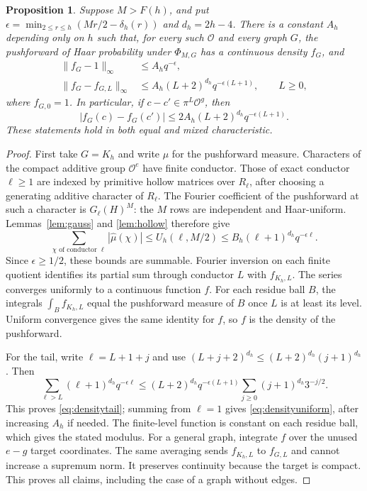 \documentclass[11pt]{article}
\numberwithin{equation}{section}
\newtheorem{proposition}[theorem]{Proposition}
\theoremstyle{remark}
\begin{document}
\begin{proposition}\label{prop:density}
Suppose $M>F(h)$, and put
$\epsilon=\min_{2\le r\le h}(Mr/2-\delta_h(r))$ and $d_h=2h-4$.
There is a constant $A_h$ depending only on $h$ such that, for every
such $\mathcal O$ and every graph $G$, the pushforward of Haar probability
under $\Phi_{M,G}$ has a continuous density $f_G$, and
\begin{align}
 \|f_G-1\|_\infty&\le A_hq^{-\epsilon},\label{eq:densityuniform}\\
 \|f_G-f_{G,L}\|_\infty
   &\le A_h(L+2)^{d_h}q^{-\epsilon(L+1)},\qquad L\ge0,
       \label{eq:densitytail}
\end{align}
where $f_{G,0}=1$. In particular, if $c-c'\in\pi^L\mathcal O^g$, then
\[
 |f_G(c)-f_G(c')|
 \le 2A_h(L+2)^{d_h}q^{-\epsilon(L+1)}.
\]
These statements hold in both equal and mixed characteristic.
\end{proposition}
\begin{proof}
First take $G=K_h$ and write $\mu$ for the pushforward measure. Characters of the compact additive group
$\mathcal O^e$ have finite conductor. Those of exact conductor
$\ell\ge1$ are indexed by primitive hollow matrices over $R_\ell$,
after choosing a generating additive character of $R_\ell$.
The Fourier coefficient of the pushforward at such a character is
$G_\ell(H)^M$: the $M$ rows are independent and Haar-uniform.
Lemmas~\ref{lem:gauss} and \ref{lem:hollow} therefore give
\[
 \sum_{\chi\text{ of conductor }\ell}
       |\widehat\mu(\chi)|
   \le U_h(\ell,M/2)
   \le B_h(\ell+1)^{d_h}q^{-\epsilon\ell}.
\]
Since $\epsilon\ge1/2$, these bounds are summable. Fourier inversion
on each finite quotient identifies its partial sum through conductor
$L$ with $f_{K_h,L}$. The series converges uniformly to a continuous
function $f$. For each residue ball $B$, the integrals
$\int_B f_{K_h,L}$ equal the pushforward measure of $B$ once $L$ is
at least its level. Uniform convergence gives the same identity for
$f$, so $f$ is the density of the pushforward.

For the tail, write $\ell=L+1+j$ and use
$(L+j+2)^{d_h}\le(L+2)^{d_h}(j+1)^{d_h}$. Then
\[
 \sum_{\ell>L}(\ell+1)^{d_h}q^{-\epsilon\ell}
 \le (L+2)^{d_h}q^{-\epsilon(L+1)}
       \sum_{j\ge0}(j+1)^{d_h}3^{-j/2}.
\]
This proves \eqref{eq:densitytail}; summing from $\ell=1$ gives
\eqref{eq:densityuniform}, after increasing $A_h$ if needed.
The finite-level function is constant on each residue ball, which
gives the stated modulus. For a general graph, integrate $f$ over the
unused $e-g$ target coordinates. The same averaging sends
$f_{K_h,L}$ to $f_{G,L}$ and cannot increase a supremum norm. It
preserves continuity because the target is compact. This proves all
claims, including the case of a graph without edges.
\end{proof}
\end{document}
